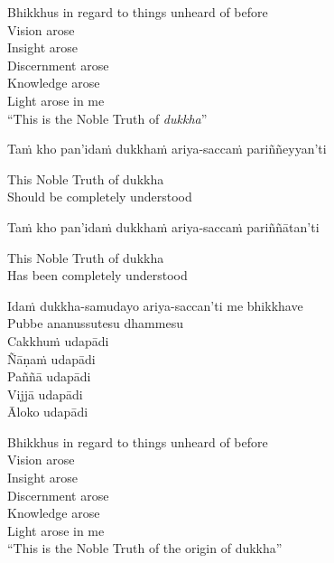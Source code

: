 \begin{english-verses}
  Bhikkhus in regard to things unheard of before\\
  Vision arose\\
  Insight arose\\
  Discernment arose\\
  Knowledge arose\\
  Light arose in me\makeatletter\hyperlink{endnote55-appendix}\makeatother\\
  ``This is the Noble Truth of \textit{dukkha}''
\end{english-verses}

Taṁ kho pan'idaṁ dukkhaṁ ariya-saccaṁ pariññeyyan'ti

\begin{english}
  This Noble Truth of dukkha\makeatletter\hyperlink{endnote56-appendix}\makeatother\\
  Should be completely understood
\end{english}

Taṁ kho pan'idaṁ dukkhaṁ ariya-saccaṁ pariññātan'ti

\begin{english}
  This Noble Truth of dukkha\\
  Has been completely understood
\end{english}

Idaṁ dukkha-samudayo ariya-saccan'ti me bhikkhave\\
Pubbe ananussutesu dhammesu\\
Cakkhuṁ udapādi\\
Ñāṇaṁ udapādi\\
Paññā udapādi\\
Vijjā udapādi\\
Āloko udapādi

\begin{english-verses}
  Bhikkhus in regard to things unheard of before\\
  Vision arose\\
  Insight arose\\
  Discernment arose\\
  Knowledge arose\\
  Light arose in me\\
  ``This is the Noble Truth of the origin of dukkha''
\end{english-verses}

